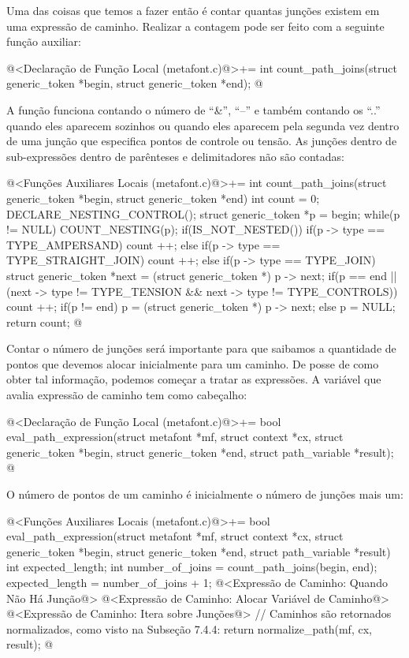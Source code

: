 Uma das coisas que temos a fazer então é contar quantas junções
existem em uma expressão de caminho. Realizar a contagem pode ser
feito com a seguinte função auxiliar:

\iniciocodigo
@<Declaração de Função Local (metafont.c)@>+=
int count_path_joins(struct generic_token *begin, struct generic_token *end);
@
\fimcodigo

A função funciona contando o número de ``\&'', ``--'' e também
contando os ``..'' quando eles aparecem sozinhos ou quando eles
aparecem pela segunda vez dentro de uma junção que especifica pontos
de controle ou tensão. As junções dentro de sub-expressões dentro de
parênteses e delimitadores não são contadas:

\iniciocodigo
@<Funções Auxiliares Locais (metafont.c)@>+=
int count_path_joins(struct generic_token *begin, struct generic_token *end){
  int count = 0;
  DECLARE_NESTING_CONTROL();
  struct generic_token *p = begin;
  while(p != NULL){
    COUNT_NESTING(p);
    if(IS_NOT_NESTED()){
      if(p -> type == TYPE_AMPERSAND)
        count ++;
      else if(p -> type == TYPE_STRAIGHT_JOIN)
        count ++;
      else if(p -> type == TYPE_JOIN){
        struct generic_token *next = (struct generic_token *) p -> next;
        if(p == end || (next -> type !=  TYPE_TENSION &&
                        next -> type != TYPE_CONTROLS))
          count ++;
      }
    }
    if(p != end)
      p = (struct generic_token *) p -> next;
    else
      p = NULL;
  }
  return count;
}
@
\fimcodigo

Contar o número de junções será importante para que saibamos a
quantidade de pontos que devemos alocar inicialmente para um caminho.
De posse de como obter tal informação, podemos começar a tratar as
expressões. A variável que avalia expressão de caminho tem como
cabeçalho:

\iniciocodigo
@<Declaração de Função Local (metafont.c)@>+=
bool eval_path_expression(struct metafont *mf, struct context *cx,
                          struct generic_token *begin,
                          struct generic_token *end,
                          struct path_variable *result);
@
\fimcodigo

O número de pontos de um caminho é inicialmente o número de junções
mais um:

\iniciocodigo
@<Funções Auxiliares Locais (metafont.c)@>+=
bool eval_path_expression(struct metafont *mf, struct context *cx,
                          struct generic_token *begin,
                          struct generic_token *end,
                          struct path_variable *result){
  int expected_length;
  int number_of_joins = count_path_joins(begin, end);
  expected_length = number_of_joins + 1;
  @<Expressão de Caminho: Quando Não Há Junção@>
  @<Expressão de Caminho: Alocar Variável de Caminho@>
  @<Expressão de Caminho: Itera sobre Junções@>
  // Caminhos são retornados normalizados, como visto na Subseção 7.4.4:
  return normalize_path(mf, cx, result); 
}
@
\fimcodigo

